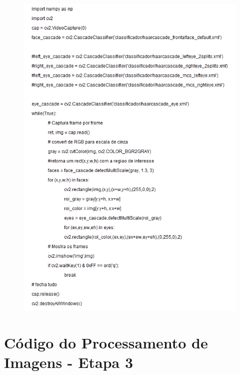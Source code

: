 \begin{apendicesenv}
\begin{figure}[H]
    \centering
      \includegraphics[scale=1.0]{figuras/img2.png}
    \label{img2}
\end{figure}

\chapter{Código do Processamento de Imagens - Etapa 3}


\end{apendicesenv}
